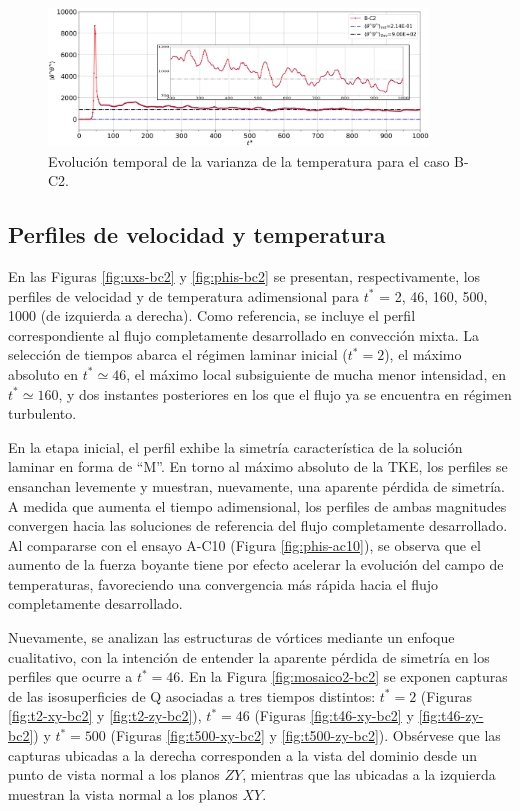 \newpage

\begin{figure}[H]
  \centering      
    \includegraphics[width=0.9\textwidth]{figures/cap6/B-C2/Cases_Comp_tetavar.eps}
     \caption{Evolución temporal de la varianza de la temperatura para el caso B-C2.}
      \label{fig:tetavar-bc2}
\end{figure}

\subsection{Perfiles de velocidad y temperatura}
En las Figuras \ref{fig:uxs-bc2} y \ref{fig:phis-bc2} se presentan, respectivamente, los perfiles de velocidad y de temperatura adimensional para $t^*$ = 2, 46, 160, 500, 1000 (de izquierda a derecha). Como referencia, se incluye el perfil correspondiente al flujo completamente desarrollado en convección mixta. La selección de tiempos abarca el régimen laminar inicial ($t^* = 2$), el máximo absoluto en $t^* \simeq 46$, el máximo local subsiguiente de mucha menor intensidad, en $t^* \simeq 160$, y dos instantes posteriores en los que el flujo ya se encuentra en régimen turbulento.

En la etapa inicial, el perfil exhibe la simetría característica de la solución laminar en forma de ``M''. En torno al máximo absoluto de la TKE, los perfiles se ensanchan levemente y muestran, nuevamente, una aparente pérdida de simetría. A medida que aumenta el tiempo adimensional, los perfiles de ambas magnitudes convergen hacia las soluciones de referencia del flujo completamente desarrollado. Al compararse con el ensayo A-C10 (Figura \ref{fig:phis-ac10}), se observa que el aumento de la fuerza boyante tiene por efecto acelerar la evolución del campo de temperaturas, favoreciendo una convergencia más rápida hacia el flujo completamente desarrollado.


Nuevamente, se analizan las estructuras de vórtices mediante un enfoque cualitativo, con la intención de entender la aparente pérdida de simetría en los perfiles que ocurre a $t^* = 46$. En la Figura \ref{fig:mosaico2-bc2} se exponen capturas de las isosuperficies de Q asociadas a tres tiempos distintos: $t^* = 2$ (Figuras \ref{fig:t2-xy-bc2} y  \ref{fig:t2-zy-bc2}),  $t^* = 46$  (Figuras \ref{fig:t46-xy-bc2} y \ref{fig:t46-zy-bc2}) y  $t^* = 500$  (Figuras \ref{fig:t500-xy-bc2} y \ref{fig:t500-zy-bc2}). Obsérvese que las capturas ubicadas a la derecha corresponden a la vista del dominio desde un punto de vista normal a los planos $ZY$, mientras que las ubicadas a la izquierda muestran la vista normal a los planos $XY$.

